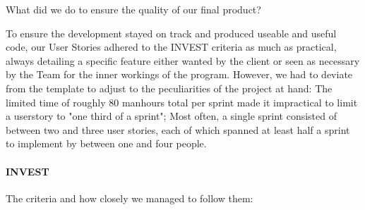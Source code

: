 
What did we do to ensure the quality of our final product? 

To ensure the development stayed on track and produced useable and useful code, our User Stories adhered to the INVEST criteria as much as practical, always detailing a specific feature either wanted by the client or seen as necessary by the Team for the inner workings of the program. 
However, we had to deviate from the template to adjust to the peculiarities of the project at hand:
The limited time of roughly 80 manhours total per sprint made it impractical to limit a userstory to "one third of a sprint"; Most often, a single sprint consisted of between two and three user stories, each of which spanned at least half a sprint to implement by between one and four people. 
\paragraph{INVEST} 
The criteria and how closely we managed to follow them:
